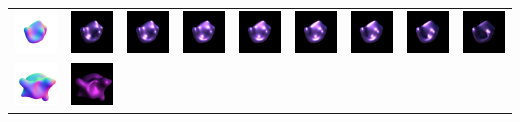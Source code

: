 \begin{center}
\begin{longtable}{@{}c@{}c@{}c@{}c@{}c@{}c@{}c@{}c@{}c@{}}
\includegraphics[width=0.1\linewidth]{training/38_gt.png} & \includegraphics[width=0.1\linewidth]{training/38_0.png} &
\includegraphics[width=0.1\linewidth]{training/38_1.png} & \includegraphics[width=0.1\linewidth]{training/38_2.png} &
\includegraphics[width=0.1\linewidth]{training/38_3.png} & \includegraphics[width=0.1\linewidth]{training/38_4.png} &
\includegraphics[width=0.1\linewidth]{training/38_5.png} & \includegraphics[width=0.1\linewidth]{training/38_6.png} &
\includegraphics[width=0.1\linewidth]{training/38_7.png} \\
\includegraphics[width=0.1\linewidth]{training/39_gt.png} & \includegraphics[width=0.1\linewidth]{training/39_0.png} &

\end{longtable}
\end{center}
